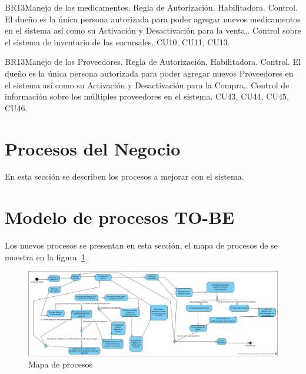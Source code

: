 \begin{BussinesRule}{BR13}{Manejo de los medicamentos.}
	\BRitem[Tipo:] Regla de Autorización. 
	\BRitem[Clase:] Habilitadora. 
	\BRitem[Nivel:] Control. %
	\BRitem[Descripción:] El dueño es la única persona autorizada para poder agregar nuevos medicamentos en el sistema así como su Activación y Desactivación para la venta,.
	\BRitem[Motivación:] Control sobre el sistema de inventario de las sucursales.
	 CU10, CU11, CU13.
\end{BussinesRule}

\begin{BussinesRule}{BR13}{Manejo de los Proveedores.}
	\BRitem[Tipo:] Regla de Autorización. 
	\BRitem[Clase:] Habilitadora. 
	\BRitem[Nivel:] Control. %
	\BRitem[Descripción:] El dueño es la única persona autorizada para poder agregar nuevos Proveedores en el sistema así como su Activación y Desactivación para la Compra,.
	\BRitem[Motivación:] Control de información sobre los múltiples proveedores en el sistema.
	 CU43, CU44, CU45, CU46.
\end{BussinesRule}

\newpage


\section{Procesos del Negocio}
En esta sección se describen los procesos a mejorar con el sistema.




\section{Modelo de procesos TO-BE}

Los nuevos procesos se presentan en esta sección, el mapa de procesos de se muestra en la figura~\ref{fig:mapaProc}.

\begin{figure}[htbp]
	\begin{center}
		\includegraphics[width=.8\textwidth]{images/procMap}
		\caption{Mapa de procesos}
		\label{fig:mapaProc}
	\end{center}
\end{figure}


















